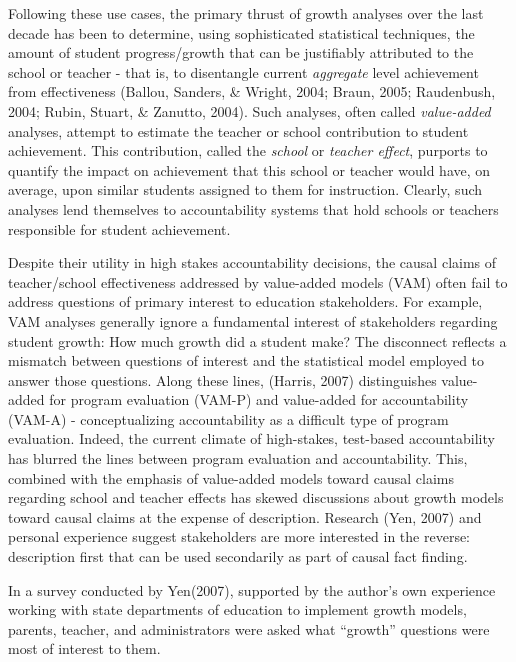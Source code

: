 \documentclass[12pt]{article}
\begin{document}
Following these use cases, the primary thrust of growth analyses over
the last decade has been to determine, using sophisticated statistical
techniques, the amount of student progress/growth that can be
justifiably attributed to the school or teacher - that is, to
disentangle current \emph{aggregate} level achievement from
effectiveness (Ballou, Sanders, \& Wright, 2004; Braun, 2005;
Raudenbush, 2004; Rubin, Stuart, \& Zanutto, 2004). Such analyses, often
called \emph{value-added} analyses, attempt to estimate the teacher or
school contribution to student achievement. This contribution, called
the \emph{school} or \emph{teacher effect}, purports to quantify the
impact on achievement that this school or teacher would have, on
average, upon similar students assigned to them for instruction.
Clearly, such analyses lend themselves to accountability systems that
hold schools or teachers responsible for student achievement.

Despite their utility in high stakes accountability decisions, the
causal claims of teacher/school effectiveness addressed by value-added
models (VAM) often fail to address questions of primary interest to
education stakeholders. For example, VAM analyses generally ignore a
fundamental interest of stakeholders regarding student growth: How much
growth did a student make? The disconnect reflects a mismatch between
questions of interest and the statistical model employed to answer those
questions. Along these lines, (Harris, 2007) distinguishes value-added
for program evaluation (VAM-P) and value-added for accountability
(VAM-A) - conceptualizing accountability as a difficult type of program
evaluation. Indeed, the current climate of high-stakes, test-based
accountability has blurred the lines between program evaluation and
accountability. This, combined with the emphasis of value-added models
toward causal claims regarding school and teacher effects has skewed
discussions about growth models toward causal claims at the expense of
description. Research (Yen, 2007) and personal experience suggest
stakeholders are more interested in the reverse: description first that
can be used secondarily as part of causal fact finding.

In a survey conducted by Yen(2007), supported by the author's own
experience working with state departments of education to implement
growth models, parents, teacher, and administrators were asked what
``growth'' questions were most of interest to them.
\end{document}
